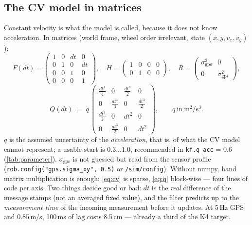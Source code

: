 \documentclass[12pt,a4paper]{scrartcl}
\newcommand{\thema}[1]{\texttt{#1}}
\newcommand{\kommando}[1]{\texttt{#1}}
\begin{document}
\subsection{The CV model in matrices}
Constant velocity is what the model is called, because it does not know acceleration. In
matrices (world frame, wheel order irrelevant, state \((x,y,v_x,v_y)\)):
\begin{equation}
  F(dt) = \begin{pmatrix}1&0&dt&0\\0&1&0&dt\\0&0&1&0\\0&0&0&1\end{pmatrix},\quad
  H = \begin{pmatrix}1&0&0&0\\0&1&0&0\end{pmatrix},\quad
  R = \begin{pmatrix}\sigma_{\text{gps}}^2&0\\0&\sigma_{\text{gps}}^2\end{pmatrix},
  \label{eq:cv}
\end{equation}
\begin{equation}
  Q(dt) \;=\; q\,
  \begin{pmatrix}\frac{dt^4}{4}&0&\frac{dt^3}{2}&0\\[2pt]
                0&\frac{dt^4}{4}&0&\frac{dt^3}{2}\\[2pt]
                  \frac{dt^3}{2}&0&dt^2&0\\[2pt]
                0&\frac{dt^3}{2}&0&dt^2\end{pmatrix},
  \qquad q\ \mathrm{in\ m^2/s^3}.
  \label{eq:q}
\end{equation}
\(q\) is the assumed uncertainty of the \emph{acceleration}, that is, of what the
CV model cannot represent; a usable start is \(0.3\ldots1.0\), recommended in
\texttt{kf.q\_acc} = 0.6 (\cref{tab:parameter}). \(\sigma_{\text{gps}}\) is not
guessed but read from the sensor profile
(\kommando{rob.config("gps.sigma\_xy", 0.5)} or \thema{/sim/config}). Without numpy, hand
matrix multiplication is enough: \cref{eq:cv} is sparse, \cref{eq:q}
block-wise — four lines of code per axis. Two things decide good or bad:
\(dt\) is the \emph{real} difference of the message stamps (not an averaged fixed value),
and the filter predicts up to the \emph{measurement time} of the incoming measurement
before it updates. At 5\,Hz GPS and 0.85\,m/s, 100\,ms of lag costs 8.5\,cm — already
a third of the K4 target.
\end{document}
